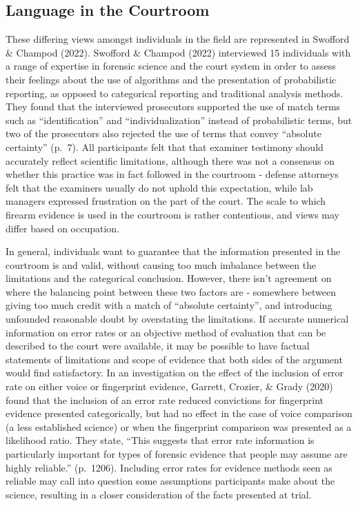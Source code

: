 \documentclass[print]{nuthesis}
\begin{document}
\hypertarget{language-in-the-courtroom}{%
\subsection{Language in the Courtroom}\label{language-in-the-courtroom}}

These differing views amongst individuals in the field are represented in Swofford \& Champod (2022).
Swofford \& Champod (2022) interviewed 15 individuals with a range of expertise in forensic science and the court system in order to assess their feelings about the use of algorithms and the presentation of probabilistic reporting, as opposed to categorical reporting and traditional analysis methods.
They found that the interviewed prosecutors supported the use of match terms such as ``identification'' and ``individualization'' instead of probabilistic terms, but two of the prosecutors also rejected the use of terms that convey ``absolute certainty'' (p.~7).
All participants felt that that examiner testimony should accurately reflect scientific limitations, although there was not a consensus on whether this practice was in fact followed in the courtroom - defense attorneys felt that the examiners usually do not uphold this expectation, while lab managers expressed frustration on the part of the court.
The scale to which firearm evidence is used in the courtroom is rather contentious, and views may differ based on occupation.

In general, individuals want to guarantee that the information presented in the courtroom is  and valid, without causing too much imbalance between the limitations and the categorical conclusion.
However, there isn't agreement on where the balancing point between these two factors are - somewhere between giving too much credit with a match of ``absolute certainty'', and introducing unfounded reasonable doubt by overstating the limitations.
If accurate numerical information on error rates or an objective method of evaluation that can be described to the court were available, it may be possible to have factual statements of limitations and scope of evidence that both sides of the argument would find satisfactory.
In an investigation on the effect of the inclusion of error rate on either voice or fingerprint evidence, Garrett, Crozier, \& Grady (2020) found that the inclusion of an error rate reduced convictions for fingerprint evidence presented categorically, but had no effect in the case of voice comparison (a less established science) or when the fingerprint comparison was presented as a likelihood ratio.
They state, ``This suggests that error rate information is particularly important for types of forensic evidence that people may assume are highly reliable.'' (p.~1206).
Including error rates for evidence methods seen as reliable may call into question some assumptions participants make about the science, resulting in a closer consideration of the facts presented at trial.
\end{document}
